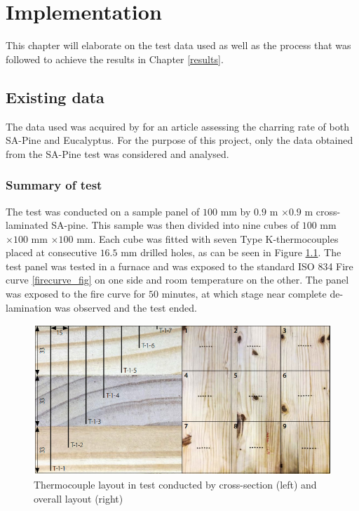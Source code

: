 \chapter{Implementation} \label{implementation}
This chapter will elaborate on the test data used as well as the process that was followed to achieve the results in Chapter \ref{results}.
\section{Existing data}
The data used was acquired by \cite{Westhuyzen:2020} for an article assessing the charring rate of both SA-Pine and Eucalyptus.
	For the purpose of this project, only the data obtained from the SA-Pine test was considered and analysed. 
	\subsection{Summary of test}
	The test was conducted on a sample panel of $100$ mm by $0.9$ m $\times 0.9$ m cross-laminated SA-pine.
	This sample was then divided into nine cubes of $100$ mm $\times 100$ mm $\times 100$ mm.
	Each cube was fitted with seven Type K-thermocouples placed at consecutive $16.5$ mm drilled holes, as can be seen in Figure \ref{TC_layout}. 
	The test panel was tested in a furnace and was exposed to the standard ISO 834 Fire curve \ref{firecurve_fig} on one side and room temperature on the other. 
	The panel was exposed to the fire curve for $50$ minutes, at which stage near complete de-lamination was observed and the test ended.
	\begin{figure}[H]
	\centering
	\includegraphics[width=0.75\linewidth]{figures/TC_layout.png}
	\caption{Thermocouple layout in test conducted by \cite{Westhuyzen:2020} cross-section (left) and overall layout (right)}
	\label{TC_layout}
	\end{figure}
	
